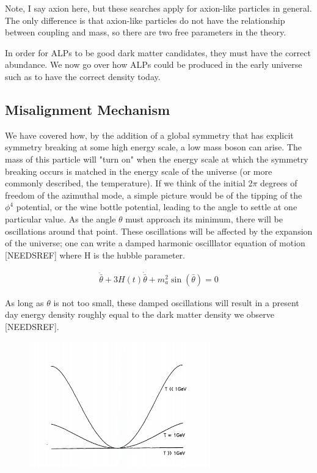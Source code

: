 \documentclass[12pt, twosides]{book}
\begin{document}
Note, I say axion here, but these searches apply for axion-like particles in general. The only difference is that axion-like particles do not have the relationship between coupling and mass, so there are two free parameters in the theory.

In order for ALPs to be good dark matter candidates, they must have the correct abundance. We now go over how ALPs could be produced in the early universe such as to have the correct density today.

\subsection{Misalignment Mechanism}

We have covered how, by the addition of a global symmetry that has explicit symmetry breaking at some high energy scale, a low mass boson can arise. The mass of this particle will "turn on" when the energy scale at which the symmetry breaking occurs is matched in the energy scale of the universe (or more commonly described, the temperature). If we think of the initial 2$\pi$ degrees of freedom of the azimuthal mode, a simple picture would be of the tipping of the $\phi^4$ potential, or the wine bottle potential, leading to the angle to settle at one particular value. As the angle $\theta$ must approach its minimum, there will be oscillations around that point. These oscillations will be affected by the expansion of the universe; one can write a damped harmonic oscilllator equation of motion [NEEDSREF] where H is the hubble parameter.

\begin{align*}
\ddot \bar{\theta} + 3H(t)\dot \bar{\theta} + m_a^2\sin(\bar{\theta}) = 0
\end{align*}

As long as $\theta$ is not too small, these damped oscillations will result in a present day energy density roughly equal to the dark matter density we observe [NEEDSREF].

\begin{figure}
\includegraphics[width=0.7\textwidth]{differentpotentials}
\end{figure}
\end{document}
